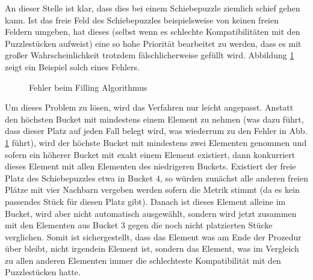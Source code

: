 \documentclass{whswinvcbook}
\begin{document}
An dieser Stelle ist klar, dass dies bei einem Schiebepuzzle ziemlich schief gehen kann. Ist das freie Feld des Schiebepuzzles beispielsweise von keinen freien Feldern umgeben, hat dieses (selbst wenn es schlechte Kompatibilitäten mit den Puzzlestücken aufweist) eine so hohe Priorität bearbeitet zu werden, dass es mit großer Wahrscheinlichkeit trotzdem fälschlicherweise gefüllt wird. Abbildung \ref{fig-dsf2} zeigt ein Beispiel solch eines Fehlers.
\begin{figure}[H]
    \centering
    \caption{Fehler beim Filling Algorithmus}
    \label{fig-dsf2}
\end{figure}
Um dieses Problem zu lösen, wird das Verfahren nur leicht angepasst. Anstatt den höchsten Bucket mit mindestens einem Element zu nehmen (was dazu führt, dass dieser Platz auf jeden Fall belegt wird, was wiederrum zu den Fehler in Abb. \ref{fig-dsf2} führt), wird der höchste Bucket mit mindestens zwei Elementen genommen und sofern ein höherer Bucket mit exakt einem Element existiert, dann konkurriert dieses Element mit allen Elementen des niedrigeren Buckets. Existiert der freie Platz des Schiebepuzzles etwa in Bucket 4, so würden zunächst alle anderen freien Plätze mit vier Nachbarn vergeben werden sofern die Metrik stimmt (da es kein passendes Stück für diesen Platz gibt). Danach ist dieses Element alleine im Bucket, wird aber nicht automatisch ausgewählt, sondern wird jetzt zusammen mit den Elementen aus Bucket 3 gegen die noch nicht platzierten Stücke verglichen. Somit ist sichergestellt, dass das Element was am Ende der Prozedur über bleibt, nicht irgendein Element ist, sondern das Element, was im Vergleich zu allen anderen Elementen immer die schlechteste Kompatibilität mit den Puzzlestücken hatte.
\end{document}
